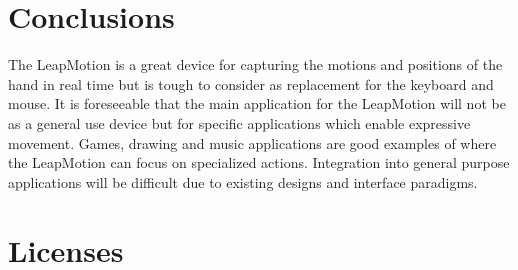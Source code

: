 \section{Conclusions}
The LeapMotion is a great device for capturing the motions and positions of the hand in real time but is tough to consider as replacement for the keyboard and mouse. It is foreseeable that the main application for the LeapMotion will not be as a general use device but for specific applications which enable expressive movement. Games, drawing and music applications are good examples of where the LeapMotion can focus on specialized actions. Integration into general purpose applications will be difficult due to existing designs and interface paradigms. 

\section{Licenses}






